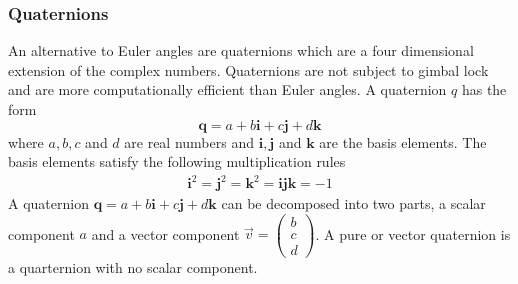 \subsubsection{Quaternions}
An alternative to Euler angles are quaternions which are a four dimensional extension of the complex numbers. Quaternions are
not subject to gimbal lock and are more computationally efficient than Euler angles. A quaternion \( q \) has the form
\begin{equation}
    \mathbf{q} = a + b\mathbf{i} + c\mathbf{j} + d\mathbf{k}
\end{equation}
where \( a, b, c \) and \( d \) are real numbers and \( \mathbf{i}, \mathbf{j} \) and \( \mathbf{k} \) are the basis elements.
The basis elements satisfy the following multiplication rules
\begin{align}
    \mathbf{i}^2 = \mathbf{j}^2 = \mathbf{k}^2 = \mathbf{ijk} = -1
\end{align}
A quaternion \( \mathbf{q} = a + b\mathbf{i} + c\mathbf{j} + d\mathbf{k}  \) can be decomposed into two parts, a scalar
component \( a \) and a vector component \( \vec{v} = \begin{pmatrix} b \\ c \\ d \end{pmatrix} \). A pure or vector quaternion
is a quarternion with no scalar component.

